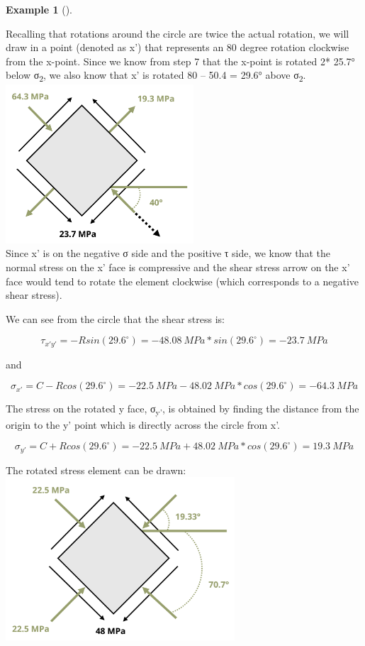 \documentclass[
  letterpaper,
  DIV=11,
  numbers=noendperiod]{scrreprt}
\theoremstyle{definition}
\newtheorem{example}{Example}[chapter]
\theoremstyle{remark}
\begin{document}
\begin{tcolorbox}
\begin{example}[]
\begin{tcolorbox}
\begin{enumerate}
  Recalling that rotations around the circle are twice the actual
  rotation, we will draw in a point (denoted as x') that represents an
  80 degree rotation clockwise from the x-point. Since we know from step
  7 that the x-point is rotated 2* 25.7° below σ\textsubscript{2}, we
  also know that x' is rotated 80 -- 50.4 = 29.6° above
  σ\textsubscript{2}.\\
  \includegraphics[width=2.76042in,height=\textheight]{images/CH12 figures/example 12.4 part 7.png}\\
  Since x' is on the negative σ side and the positive τ side, we know
  that the normal stress on the x' face is compressive and the shear
  stress arrow on the x' face would tend to rotate the element clockwise
  (which corresponds to a negative shear stress).

  We can see from the circle that the shear stress is:

  \[
  \tau_{x'y'}=-Rsin(29.6^\circ)=-48.08{~MPa}*sin(29.6^\circ)=-23.7{~MPa}
  \]

  and

  \[
  \sigma_{x'}=C-Rcos(29.6^\circ)=-22.5{~MPa}-48.02{~MPa}*cos(29.6^\circ)=-64.3{~MPa}
  \]

  The stress on the rotated y face, σ\textsubscript{y'}, is obtained by
  finding the distance from the origin to the y' point which is directly
  across the circle from x'.

  \[
  \sigma_{y'}=C+Rcos(29.6^\circ)=-22.5{~MPa}+48.02{~MPa}*cos(29.6^\circ)=19.3{~MPa}
  \]

  The rotated stress element can be drawn:\\
  \includegraphics[width=3.36458in,height=\textheight]{images/CH12 figures/example 12.4 part 8.png}
\end{enumerate}


\end{tcolorbox}
\end{example}
\end{tcolorbox}
\end{document}
